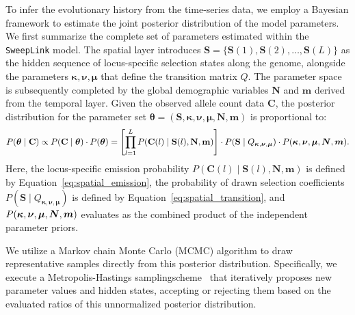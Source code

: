 \documentclass{article}
\def\m{\mbox{\boldmath $m$}}
\def\N{\mbox{\boldmath $N$}}
\newcommand{\SweepLink}{\texttt{SweepLink}\xspace}
\begin{document}
To infer the evolutionary history from the time-series data, we employ a Bayesian framework to estimate the joint posterior distribution of the model parameters.
We first summarize the complete set of parameters estimated within the \SweepLink model.
The spatial layer introduces $\mathbf{S} = \{\mathbf{S}(1), \mathbf{S}(2), \dots, \mathbf{S}(L)\}$ as the hidden sequence of locus-specific selection states along the genome, alongside the parameters $\boldsymbol{\kappa}, \boldsymbol{\nu}, \boldsymbol{\mu}$ that define the transition matrix $Q$.
The parameter space is subsequently completed by the global demographic variables $\mathbf{N}$ and $\mathbf{m}$ derived from the temporal layer.
Given the observed allele count data $\mathbf{C}$, the posterior distribution for the parameter set $\boldsymbol{\theta} = (\mathbf{S}, \boldsymbol{\kappa}, \boldsymbol{\nu}, \boldsymbol{\mu}, \mathbf{N}, \mathbf{m})$ is proportional to:
$$
P(\boldsymbol{\theta} \mid \mathbf{C}) \propto P(\mathbf{C} \mid \boldsymbol{\theta}) \cdot P(\boldsymbol{\theta}) = \left[ \prod_{l=1}^L P(\mathbf{C}(l) \mid \mathbf{S}(l), \mathbf{N}, \mathbf{m})\right] \cdot P(\mathbf{S} \mid Q_{\boldsymbol{\kappa}, \boldsymbol{\nu}, \boldsymbol{\mu}}) \cdot P(\boldsymbol{\kappa}, \boldsymbol{\nu}, \boldsymbol{\mu}, \N, \m).
$$
Here, the locus-specific emission probability $P(\mathbf{C}(l) \mid \mathbf{S}(l), \mathbf{N}, \mathbf{m})$ is defined by Equation~\ref{eq:spatial_emission}, the probability of drawn selection coefficients $P(\mathbf{S} \mid Q_{\boldsymbol{\kappa}, \boldsymbol{\nu}, \boldsymbol{\mu}})$ is defined by Equation~\ref{eq:spatial_transition}, and $P(\boldsymbol{\kappa}, \boldsymbol{\nu}, \boldsymbol{\mu}, \N, \m)$ evaluates as the combined product of the independent parameter priors.

We utilize a Markov chain Monte Carlo (MCMC) algorithm to draw representative samples directly from this posterior distribution.
Specifically, we execute a Metropolis-Hastings sampling\linebreak scheme~\citep{metropolis1953,hastings1970} that iteratively proposes new parameter values and hidden states, accepting or rejecting them based on the evaluated ratios of this unnormalized posterior distribution.

\bigskip
\end{document}
